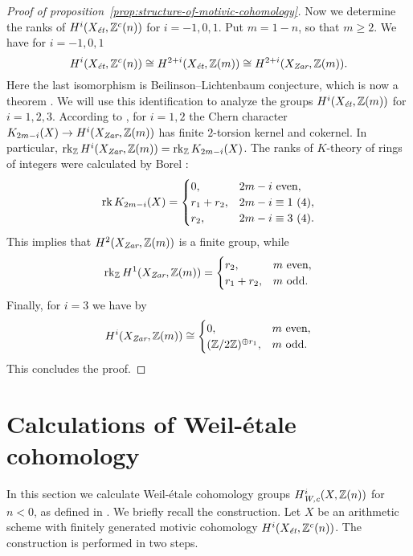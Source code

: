 \documentclass{article}
\numberwithin{equation}{section}
\begin{document}
\begin{proof}[Proof of proposition~\ref{prop:structure-of-motivic-cohomology}]
  Now we determine the ranks of $H^i (X_\et, \ZZ^c (n))$ for $i = -1,0,1$.
  Put $m = 1-n$, so that $m \ge 2$. We have for $i = -1,0,1$
  \[ H^i (X_\et, \ZZ^c(n)) \cong
    H^{2+i} (X_\et, \ZZ (m)) \cong
    H^{2+i} (X_\Zar, \ZZ(m)). \]
  Here the last isomorphism is Beilinson--Lichtenbaum conjecture,
  which is now a theorem \cite[Theorem~1.2]{Geisser-2004-Dedekind}.
  We will use this identification to analyze
  the groups $H^i (X_\et, \ZZ (m))$ for $i = 1,2,3$. According to
  \cite[Proposition~2.1]{Kolster-Sands-2008}, for $i = 1,2$ the Chern
  character
  $K_{2m - i} (X) \to H^i (X_\Zar, \ZZ(m))$
  has finite $2$-torsion kernel and cokernel. In particular,
  $\rk_\ZZ H^i (X_\Zar, \ZZ(m)) = \rk_\ZZ K_{2m - i} (X)$.
  The ranks of $K$-theory of rings of integers were calculated by Borel
  \cite{Borel-1974}:
  \[ \rk K_{2m-i} (X) = \begin{cases}
      0, & 2m - i \text{ even}, \\
      r_1 + r_2, & 2m - i \equiv 1 ~ (4), \\
      r_2, & 2m - i \equiv 3 ~ (4).
    \end{cases} \]
  This implies that $H^2 (X_\Zar, \ZZ(m))$ is a finite group, while
  \[ \rk_\ZZ H^1 (X_\Zar, \ZZ(m)) =
    \begin{cases}
      r_2, & m \text{ even}, \\
      r_1 + r_2, & m \text{ odd}.
    \end{cases} \]
  Finally, for $i = 3$ we have by \cite[p.\,179]{Kolster-Sands-2008}
  \[ H^i (X_\Zar, \ZZ (m)) \cong
    \begin{cases}
      0, & m\text{ even}, \\
      (\ZZ/2\ZZ)^{\oplus r_1}, & m\text{ odd}.
    \end{cases} \]
  This concludes the proof.
\end{proof}


\section{Calculations of Weil-étale cohomology}
\label{sec:Weil-etale-cohomology-of-X}

In this section we calculate Weil-étale cohomology groups $H^i_\Wc (X, \ZZ(n))$
for $n < 0$, as defined in \cite{Beshenov-Weil-etale-1}. We briefly recall the
construction. Let $X$ be an arithmetic scheme with finitely generated motivic
cohomology $H^i (X_\et, \ZZ^c(n))$. The construction is performed in two steps.
\end{document}
